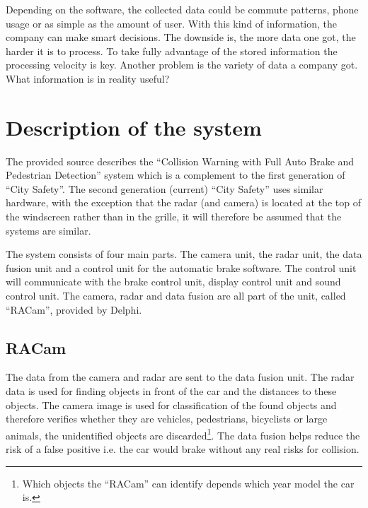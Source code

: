 \documentclass[conference]{IEEEtran}
\begin{document}
Depending on the software, the collected data could be commute patterns, phone usage or as simple as the amount of user. With this kind of information, the company can make smart decisions. The downside is, the more data one got, the harder it is to process. To take fully advantage of the stored information the processing velocity is key. Another problem is the variety of data a company got. What information is in reality useful? \cite{SpeedDataEco} 


\section{Description of the system}
The provided source describes the ``Collision Warning with Full Auto Brake and Pedestrian Detection'' system which is a complement to the first generation of ``City Safety''. The second generation (current) ``City Safety'' uses similar hardware, with the exception that the radar (and camera) is located at the top of the windscreen rather than in the grille, it will therefore be assumed that the systems are similar. \cite{SysDescription,RACam,DelphiVolvo}

The system consists of four main parts. The camera unit, the radar unit, the data fusion unit and a control unit for the automatic brake software. The control unit will communicate with the brake control unit, display control unit and sound control unit. The camera, radar and data fusion are all part of the unit, called ``RACam'', provided by Delphi. \cite{SysDescription,DelphiVolvo}

\subsection{RACam}
The data from the camera and radar are sent to the data fusion unit. The radar data is used for finding objects in front of the car and the distances to these objects. The camera image is used for classification of the found objects and therefore verifies whether they are vehicles, pedestrians, bicyclists or large animals, the unidentified objects are discarded\footnote{Which objects the ``RACam'' can identify depends which year model the car is.}. The data fusion helps reduce the risk of a false positive i.e. the car would brake without any real risks for collision. \cite{SysDescription}
\end{document}
